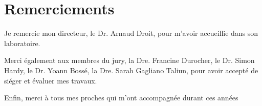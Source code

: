 \chapter*{Remerciements}         %

Je remercie mon directeur, le Dr. Arnaud Droit, pour m'avoir accueillie dans son laboratoire.

Merci également aux membres du jury, la Dre. Francine Durocher, le Dr. Simon Hardy, le Dr. Yoann Bossé, la Dre. Sarah Gagliano Taliun, pour avoir accepté de siéger et évaluer mes travaux.

Enfin, merci à tous mes proches qui m'ont accompagnée durant ces années 
